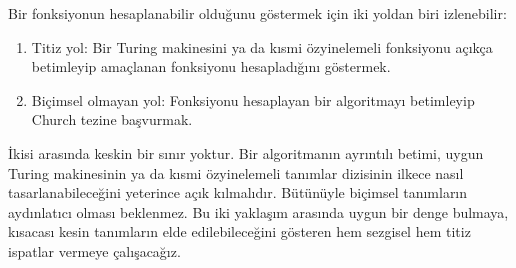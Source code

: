 Bir fonksiyonun hesaplanabilir olduğunu göstermek için iki yoldan biri
izlenebilir:
\begin{enumerate}
\item Titiz yol: Bir Turing makinesini ya da kısmi özyinelemeli fonksiyonu
  açıkça betimleyip amaçlanan fonksiyonu hesapladığını göstermek.
\item Biçimsel olmayan yol: Fonksiyonu hesaplayan bir algoritmayı betimleyip
  Church tezine başvurmak.
\end{enumerate}
İkisi arasında keskin bir sınır yoktur. Bir algoritmanın ayrıntılı betimi,
uygun Turing makinesinin ya da kısmi özyinelemeli tanımlar dizisinin ilkece
nasıl tasarlanabileceğini yeterince açık kılmalıdır. Bütünüyle biçimsel
tanımların aydınlatıcı olması beklenmez. Bu iki yaklaşım arasında uygun bir
denge bulmaya, kısacası kesin tanımların elde edilebileceğini gösteren hem
sezgisel hem titiz ispatlar vermeye çalışacağız.

